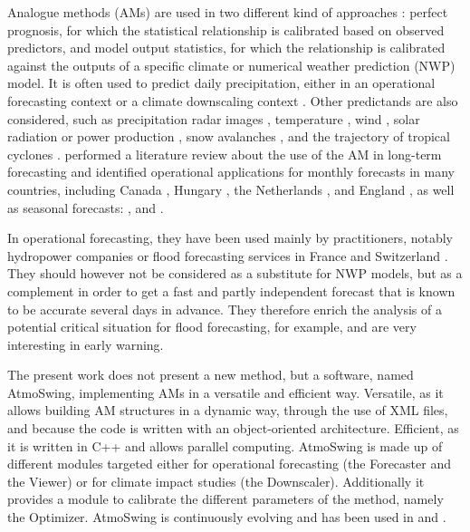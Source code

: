 \documentclass[review]{elsarticle}
\begin{document}
Analogue methods (AMs) are used in two different kind of approaches \citep{Rummukainen1997}: perfect prognosis, for which the statistical relationship is calibrated based on observed predictors, and model output statistics, for which the relationship is calibrated against the outputs of a specific climate or numerical weather prediction (NWP) model. It is often used to predict daily precipitation, either in an operational forecasting context \citep[e.g.][]{Guilbaud1997, Bontron2005, Hamill2006, Bliefernicht2010, Marty2012, Horton2012, Hamill2015, BenDaoud2016} or a climate downscaling context \citep[e.g.][]{Radanovics2013, Chardon2014, Dayon2015, Raynaud2016b}. Other predictands are also considered, such as precipitation radar images \citep{Panziera2011,Foresti2015a}, temperature \citep{Radinovic1975, Woodcock1980, Kruizinga1983, DelleMonache2013, Caillouet2016, Raynaud2016b}, wind \citep{Gordon1987, DelleMonache2013, DelleMonache2011, Vanvyve2015, Alessandrini2015, Junk2015, Junk2015c}, solar radiation or power production \citep{Alessandrini2015a, Bessa2015, Raynaud2016b}, snow avalanches \citep{Obled1980, Bolognesi1993}, and the trajectory of tropical cyclones \citep{Keenan1981, Sievers2000, Fraedrich2003}. \citet{Guilbaud1997} performed a literature review about the use of the AM in long-term forecasting and identified operational applications for monthly forecasts in many countries, including Canada \citep{Shabbar1986},  Hungary \citep{Toth1989}, the Netherlands \citep{Nap1981}, and England \citep{Murray1974}, as well as seasonal forecasts: \citet{Barnett1978}, \citet{Bergen1982} and \citet{Livezey1988}.

In operational forecasting, they have been used mainly by practitioners, notably hydropower companies \citep{Desaint2008a,BenDaoud2009,Obled2014} or flood forecasting services in France and Switzerland \citep{Marty2010,GarciaHernandez2009b,Horton2012}. They should however not be considered as a substitute for NWP models, but as a complement in order to get a fast and partly independent forecast that is known to be accurate several days in advance. They therefore enrich the analysis of a potential critical situation for flood forecasting, for example, and are very interesting in early warning.

The present work does not present a new method, but a software, named AtmoSwing, implementing AMs in a versatile and efficient way. Versatile, as it allows building AM structures in a dynamic way, through the use of XML files, and because the code is written with an object-oriented architecture. Efficient, as it is written in C++ and allows parallel computing. AtmoSwing is made up of different modules targeted either for operational forecasting (the Forecaster and the Viewer) or for climate impact studies (the Downscaler). Additionally it provides a module to calibrate the different parameters of the method, namely the Optimizer. AtmoSwing is continuously evolving and has been used in \citet{Horton2012, Horton2017a, Horton2017b, Horton2018a} and \citet{Horton2018b}.
\end{document}
